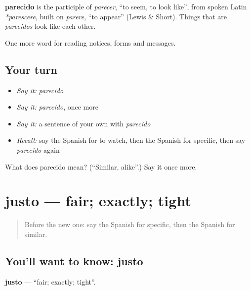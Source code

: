 \begin{cousinweb}
\textbf{parecido} is the participle of \emph{parecer}, \textquotedblleft{}to seem, to look like\textquotedblright{}, from spoken Latin \emph{*parescere}, built on \emph{parere}, \textquotedblleft{}to appear\textquotedblright{} (Lewis \& Short). Things that are \emph{parecidos} look like each other.
\end{cousinweb}

\begin{grammarlens}[title={What you've built}]
One more word for reading notices, forms and messages.
\end{grammarlens}

\subsection*{Your turn}
\begin{itemize}
\raggedright
  \item \emph{Say it:} \emph{parecido}
  \item \emph{Say it:} \emph{parecido}, once more
  \item \emph{Say it:} a sentence of your own with \emph{parecido}
  \item \emph{Recall:} say the Spanish for to watch, then the Spanish for specific, then say \emph{parecido} again
\end{itemize}

\begin{tcolorbox}[breakable,colback=teal!4,colframe=teal!35!black,title={Before you move on}]
What does parecido mean? (\textquotedblleft{}Similar, alike\textquotedblright{}.) Say it once more.
\end{tcolorbox}
\section[justo]{justo — fair; exactly; tight}

\label{lesson:ES-C482-justo}



\begin{quote}
Before the new one: say the Spanish for specific, then the Spanish for similar.
\end{quote}

\subsection*{You'll want to know: justo}
\textbf{justo} — \textquotedblleft{}fair; exactly; tight\textquotedblright{}.


